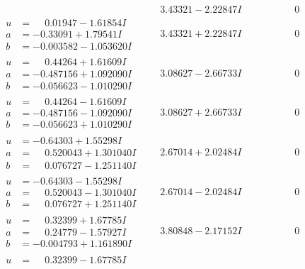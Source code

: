 \documentclass[1p]{elsarticle_modified}
\theoremstyle{definition}
\begin{document}
$$\begin{array}{c|c|c}
 & \phantom{-}3.43321 - 2.22847 I & \phantom{-0.000000 } 0 \\ \hline\begin{aligned}
u &= \phantom{-}0.01947 - 1.61854 I \\
a &= -0.33091 + 1.79541 I \\
b &= -0.003582 - 1.053620 I\end{aligned}
 & \phantom{-}3.43321 + 2.22847 I & \phantom{-0.000000 } 0 \\ \hline\begin{aligned}
u &= \phantom{-}0.44264 + 1.61609 I \\
a &= -0.487156 + 1.092090 I \\
b &= -0.056623 - 1.010290 I\end{aligned}
 & \phantom{-}3.08627 - 2.66733 I & \phantom{-0.000000 } 0 \\ \hline\begin{aligned}
u &= \phantom{-}0.44264 - 1.61609 I \\
a &= -0.487156 - 1.092090 I \\
b &= -0.056623 + 1.010290 I\end{aligned}
 & \phantom{-}3.08627 + 2.66733 I & \phantom{-0.000000 } 0 \\ \hline\begin{aligned}
u &= -0.64303 + 1.55298 I \\
a &= \phantom{-}0.520043 + 1.301040 I \\
b &= \phantom{-}0.076727 - 1.251140 I\end{aligned}
 & \phantom{-}2.67014 + 2.02484 I & \phantom{-0.000000 } 0 \\ \hline\begin{aligned}
u &= -0.64303 - 1.55298 I \\
a &= \phantom{-}0.520043 - 1.301040 I \\
b &= \phantom{-}0.076727 + 1.251140 I\end{aligned}
 & \phantom{-}2.67014 - 2.02484 I & \phantom{-0.000000 } 0 \\ \hline\begin{aligned}
u &= \phantom{-}0.32399 + 1.67785 I \\
a &= \phantom{-}0.24779 - 1.57927 I \\
b &= -0.004793 + 1.161890 I\end{aligned}
 & \phantom{-}3.80848 - 2.17152 I & \phantom{-0.000000 } 0 \\ \hline\begin{aligned}
u &= \phantom{-}0.32399 - 1.67785 I \\

\end{aligned}
\end{array}$$
\end{document}
